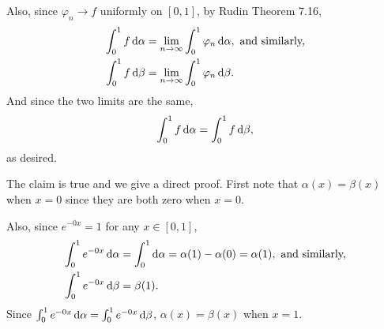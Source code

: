 \documentclass[12pt]{article}
\begin{document}
\begin{fproof}[3(a)]
Also, since \(\varphi_n \to f\) uniformly on \([0,1]\), by Rudin Theorem 7.16,
\begin{align*}
    \int_{0}^{1} f \mathop{}\!\mathrm{d}\alpha &= \lim_{n \to \infty} \int_{0}^{1} \varphi_n \mathop{}\!\mathrm{d}\alpha, \text{ and similarly,}\\
    \int_{0}^{1} f \mathop{}\!\mathrm{d}\beta &= \lim_{n \to \infty} \int_{0}^{1} \varphi_n \mathop{}\!\mathrm{d}\beta.
\end{align*}
And since the two limits are the same,
\begin{align*}
    \int_{0}^{1} f \mathop{}\!\mathrm{d}\alpha = \int_{0}^{1} f \mathop{}\!\mathrm{d}\beta,
\end{align*}
as desired.
\end{fproof}

\begin{fproof}[3(b)]
The claim is true and we give a direct proof.
First note that \(\alpha(x) = \beta(x)\) when \(x = 0\) since they are both zero when \(x =0\).

Also, since \(e^{-0x} = 1\) for any \(x \in [0,1]\),
\begin{align*}
    \int_{0}^{1} e^{-0x} \mathop{}\!\mathrm{d}\alpha &= \int_{0}^{1} \mathop{}\!\mathrm{d}\alpha = \alpha(1) - \alpha(0) = \alpha(1), \text{ and similarly,}\\
    \int_{0}^{1} e^{-0x} \mathop{}\!\mathrm{d}\beta & = \beta(1).
\end{align*}
Since \(\int_{0}^{1} e^{-0x} \mathop{}\!\mathrm{d}\alpha = \int_{0}^{1} e^{-0x} \mathop{}\!\mathrm{d}\beta\), \(\alpha(x) = \beta(x)\) when \(x = 1\).


\end{fproof}
\end{document}
